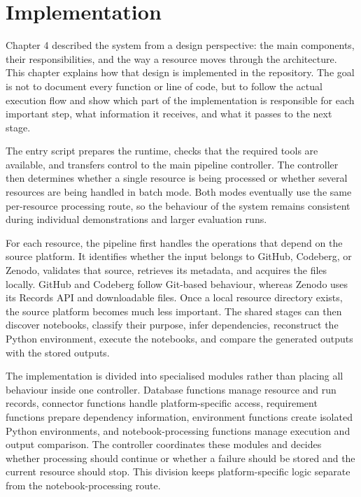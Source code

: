 \chapter{Implementation}
\label{chap:implementation}

Chapter 4 described the system from a design perspective: the main components, their responsibilities, and the way a resource moves through the architecture. This chapter explains how that design is implemented in the repository. The goal is not to document every function or line of code, but to follow the actual execution flow and show which part of the implementation is responsible for each important step, what information it receives, and what it passes to the next stage.

The entry script prepares the runtime, checks that the required tools are available, and transfers control to the main pipeline controller. The controller then determines whether a single resource is being processed or whether several resources are being handled in batch mode. Both modes eventually use the same per-resource processing route, so the behaviour of the system remains consistent during individual demonstrations and larger evaluation runs.

For each resource, the pipeline first handles the operations that depend on the source platform. It identifies whether the input belongs to GitHub, Codeberg, or Zenodo, validates that source, retrieves its metadata, and acquires the files locally. GitHub and Codeberg follow Git-based behaviour, whereas Zenodo uses its Records API and downloadable files. Once a local resource directory exists, the source platform becomes much less important. The shared stages can then discover notebooks, classify their purpose, infer dependencies, reconstruct the Python environment, execute the notebooks, and compare the generated outputs with the stored outputs.

The implementation is divided into specialised modules rather than placing all behaviour inside one controller. Database functions manage resource and run records, connector functions handle platform-specific access, requirement functions prepare dependency information, environment functions create isolated Python environments, and notebook-processing functions manage execution and output comparison. The controller coordinates these modules and decides whether processing should continue or whether a failure should be stored and the current resource should stop. This division keeps platform-specific logic separate from the notebook-processing route.

